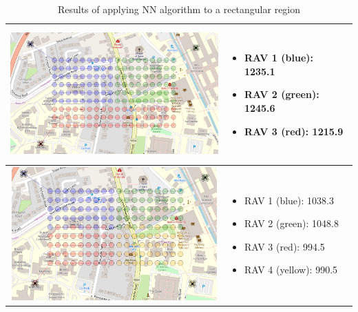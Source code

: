 \begin{table}[h!]
\begin{tabular}{ | c | m{5cm} | }
    \begin{minipage}[c][53mm][c]{.6\textwidth}
      \includegraphics[width=\linewidth, height=51mm]{Chapters/MultiAgentCoverage/MultipleTravellingSalesman/Figs/Rectangle/ThreeAgent.PNG}
    \end{minipage}
    &
    \begin{itemize}[leftmargin=*]
    \item[] RAV 1 (blue): 1235.1
    \item[] RAV 2 (green): 1245.6
    \item[] RAV 3 (red): 1215.9
    \end{itemize}
    \\
    \hline
    
    \begin{minipage}[c][53mm][c]{.6\textwidth}
      \includegraphics[width=\linewidth, height=51mm]{Chapters/MultiAgentCoverage/MultipleTravellingSalesman/Figs/Rectangle/FourAgent.PNG}
    \end{minipage}
    &
    \begin{itemize}[leftmargin=*]
    \item[] RAV 1 (blue): 1038.3
    \item[] RAV 2 (green): 1048.8
    \item[] RAV 3 (red): 994.5
    \item[] RAV 4 (yellow): 990.5
    \end{itemize}

    \\
    \hline
  \end{tabular}
  \caption{Results of applying NN algorithm to a rectangular region}\label{table:NNAlgoResultsRect}
\end{table}


